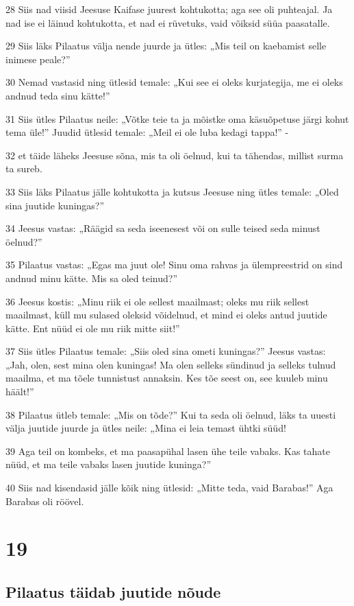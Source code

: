 \par 28 Siis nad viisid Jeesuse Kaifase juurest kohtukotta; aga see oli puhteajal. Ja nad ise ei läinud kohtukotta, et nad ei rüvetuks, vaid võiksid süüa paasatalle.
\par 29 Siis läks Pilaatus välja nende juurde ja ütles: „Mis teil on kaebamist selle inimese peale?”
\par 30 Nemad vastasid ning ütlesid temale: „Kui see ei oleks kurjategija, me ei oleks andnud teda sinu kätte!”
\par 31 Siis ütles Pilaatus neile: „Võtke teie ta ja mõistke oma käsuõpetuse järgi kohut tema üle!” Juudid ütlesid temale: „Meil ei ole luba kedagi tappa!” -
\par 32 et täide läheks Jeesuse sõna, mis ta oli öelnud, kui ta tähendas, millist surma ta sureb.
\par 33 Siis läks Pilaatus jälle kohtukotta ja kutsus Jeesuse ning ütles temale: „Oled sina juutide kuningas?”
\par 34 Jeesus vastas: „Räägid sa seda iseenesest või on sulle teised seda minust öelnud?”
\par 35 Pilaatus vastas: „Egas ma juut ole! Sinu oma rahvas ja ülempreestrid on sind andnud minu kätte. Mis sa oled teinud?”
\par 36 Jeesus kostis: „Minu riik ei ole sellest maailmast; oleks mu riik sellest maailmast, küll mu sulased oleksid võidelnud, et mind ei oleks antud juutide kätte. Ent nüüd ei ole mu riik mitte siit!”
\par 37 Siis ütles Pilaatus temale: „Siis oled sina ometi kuningas?” Jeesus vastas: „Jah, olen, sest mina olen kuningas! Ma olen selleks sündinud ja selleks tulnud maailma, et ma tõele tunnistust annaksin. Kes tõe seest on, see kuuleb minu häält!”
\par 38 Pilaatus ütleb temale: „Mis on tõde?” Kui ta seda oli öelnud, läks ta uuesti välja juutide juurde ja ütles neile: „Mina ei leia temast ühtki süüd!
\par 39 Aga teil on kombeks, et ma paasapühal lasen ühe teile vabaks. Kas tahate nüüd, et ma teile vabaks lasen juutide kuninga?”
\par 40 Siis nad kisendasid jälle kõik ning ütlesid: „Mitte teda, vaid Barabas!” Aga Barabas oli röövel.


\chapter{19}

\section*{Pilaatus täidab juutide nõude}

